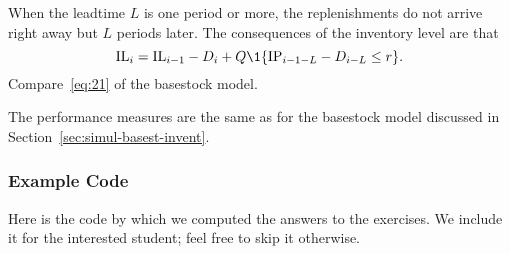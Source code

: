 When the leadtime $L$ is one period or more, the replenishments do not
arrive right away but $L$ periods later. The consequences of the
inventory level are that
\begin{equation}
  \IL_i = \IL_{i-1} - D_i + Q\1{\IP_{i-1-L} - D_{i-L}\leq r}.
\end{equation}
Compare~\eqref{eq:21} of the basestock model.

The performance measures are the same as for the basestock model discussed in Section~\ref{sec:simul-basest-invent}.


\subsubsection{Example Code}
\label{sec:qr_example-code}

Here is the code by which we computed the answers to the exercises. We include it for the interested student; feel free to skip it otherwise.




